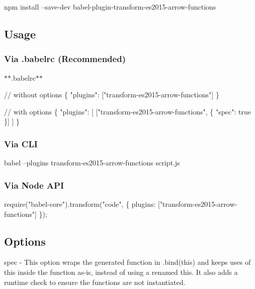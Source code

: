 \begin{DoxyCode}
npm install --save-dev babel-plugin-transform-es2015-arrow-functions
\end{DoxyCode}


\subsection*{Usage}

\subsubsection*{Via {\ttfamily .babelrc} (Recommended)}

$\ast$$\ast$.babelrc$\ast$$\ast$


\begin{DoxyCode}
// without options
\{
  "plugins": ["transform-es2015-arrow-functions"]
\}

// with options
\{
  "plugins": [
    ["transform-es2015-arrow-functions", \{ "spec": true \}]
  ]
\}
\end{DoxyCode}


\subsubsection*{Via C\+LI}


\begin{DoxyCode}
babel --plugins transform-es2015-arrow-functions script.js
\end{DoxyCode}


\subsubsection*{Via Node A\+PI}


\begin{DoxyCode}
require("babel-core").transform("code", \{
  plugins: ["transform-es2015-arrow-functions"]
\});
\end{DoxyCode}


\subsection*{Options}


\begin{DoxyItemize}
\item {\ttfamily spec} -\/ This option wraps the generated function in {\ttfamily .bind(this)} and keeps uses of {\ttfamily this} inside the function as-\/is, instead of using a renamed {\ttfamily this}. It also adds a runtime check to ensure the functions are not instantiated. 
\end{DoxyItemize}